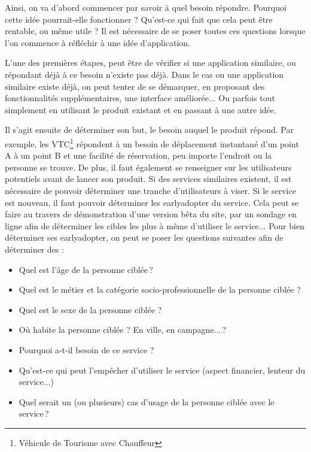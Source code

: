 Ainsi, on va d'abord commencer par savoir à quel besoin répondre. Pourquoi cette idée pourrait-elle fonctionner ? Qu'est-ce qui fait que cela peut être rentable, ou même utile ? Il est nécessaire de se poser toutes ces questions lorsque l'on commence à réfléchir à une idée d'application.

L'une des premières étapes, peut être de vérifier si une application similaire, ou répondant déjà à ce besoin n'existe pas déjà. Dans le cas ou une application similaire existe déjà, on peut tenter de se démarquer, en proposant des fonctionnalités supplémentaires, une interface améliorée... Ou parfois tout simplement en utilisant le produit existant et en passant à une autre idée.

Il s'agit ensuite de déterminer son but, le besoin auquel le produit répond. Par exemple, les VTC\footnote{Véhicule de Tourisme avec Chauffeur} répondent à un besoin de déplacement instantané d'un point A à un point B et une facilité de réservation, peu importe l'endroit ou la personne se trouve. De plus, il faut également se renseigner sur les utilisateurs potentiels avant de lancer son produit. Si des services similaires existent, il est nécessaire de pouvoir déterminer une tranche d'utilisateurs à viser. Si le service est nouveau, il faut pouvoir déterminer les \gls{earlyadopter} du service. Cela peut se faire au travers de démonstration d'une version bêta du site, par un sondage en ligne afin de déterminer les cibles les plus à même d'utiliser le service... Pour bien déterminer ses \gls{earlyadopter}, on peut se poser les questions suivantes afin de déterminer des  :

\begin{itemize}
	\setlength\itemsep{-0.5em}
	\item Quel est l'âge de la personne ciblée ?
	\item Quel est le métier et la catégorie socio-professionnelle de la personne ciblée ?
	\item Quel est le sexe de la personne ciblée ? 
	\item Où habite la personne ciblée ? En ville, en campagne... ? 
	\item Pourquoi a-t-il besoin de ce service ? 
	\item Qu'est-ce qui peut l'empêcher d'utiliser le service (aspect financier, lenteur du service...) 
	\item Quel serait un (ou plusieurs) cas d'usage de la personne ciblée avec le service ?
\end{itemize}


